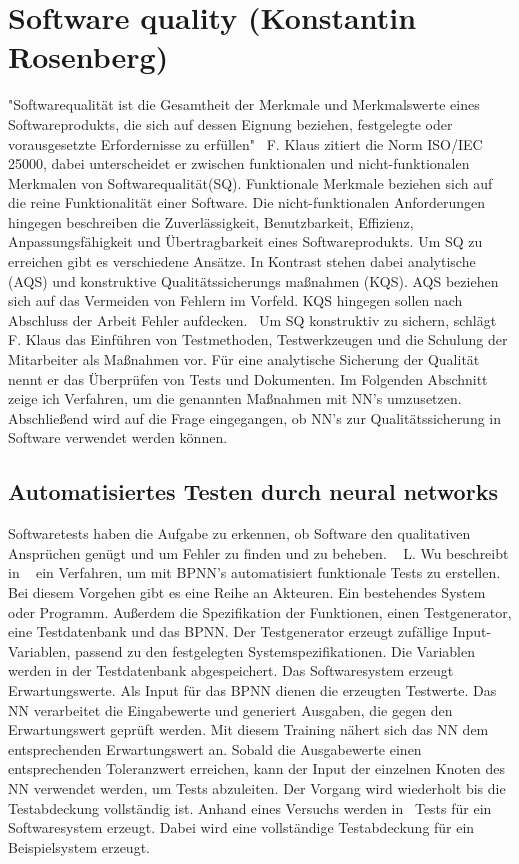 \section{Software quality (Konstantin Rosenberg)}
"Softwarequalität ist die Gesamtheit der Merkmale und Merkmalswerte eines Softwareprodukts, die sich auf dessen Eignung beziehen,
festgelegte oder vorausgesetzte
Erfordernisse zu erfüllen"~\cite[p.~20]{Franz2015}
F. Klaus zitiert die Norm ISO/IEC 25000, dabei unterscheidet er zwischen funktionalen und nicht-funktionalen Merkmalen von Softwarequalität(SQ).
Funktionale Merkmale beziehen sich auf die reine Funktionalität einer Software. Die nicht-funktionalen Anforderungen hingegen beschreiben die Zuverlässigkeit, Benutzbarkeit, Effizienz, Anpassungsfähigkeit und Übertragbarkeit eines Softwareprodukts.
Um SQ zu erreichen gibt es verschiedene Ansätze. In Kontrast stehen dabei analytische (AQS) und konstruktive Qualitätssicherungs
maßnahmen (KQS). AQS beziehen sich auf das Vermeiden von Fehlern im Vorfeld. KQS hingegen sollen nach Abschluss der Arbeit Fehler aufdecken.~\cite[p.~29]{Franz2015} 
Um SQ konstruktiv zu sichern, schlägt F. Klaus das Einführen von Testmethoden, Testwerkzeugen und die Schulung der Mitarbeiter als Maßnahmen vor. Für eine analytische Sicherung der Qualität nennt er das Überprüfen von Tests und Dokumenten.
Im Folgenden Abschnitt zeige ich Verfahren, um die genannten Maßnahmen mit NN's umzusetzen. Abschließend wird auf die Frage eingegangen, ob NN's zur Qualitätssicherung in Software verwendet werden können.

\subsection{Automatisiertes Testen durch neural networks}
Softwaretests haben die Aufgabe zu erkennen, ob Software den qualitativen Ansprüchen genügt und um Fehler zu finden und zu beheben. ~\cite{Wu2008}
L. Wu beschreibt in ~\cite{Wu2008} ein Verfahren, um mit BPNN's automatisiert funktionale Tests zu erstellen. 
Bei diesem Vorgehen gibt es eine Reihe an Akteuren. Ein bestehendes System oder Programm. Außerdem die Spezifikation der Funktionen, einen Testgenerator, eine Testdatenbank und das BPNN. Der Testgenerator erzeugt zufällige Input-Variablen, passend zu den festgelegten Systemspezifikationen. Die Variablen werden in der Testdatenbank abgespeichert. Das Softwaresystem erzeugt Erwartungswerte. Als Input für das BPNN dienen die erzeugten Testwerte. Das NN verarbeitet die Eingabewerte und generiert Ausgaben, die gegen den Erwartungswert geprüft werden.
Mit diesem Training nähert sich das NN dem entsprechenden Erwartungswert an.
Sobald die Ausgabewerte einen entsprechenden Toleranzwert erreichen, kann der Input der einzelnen Knoten des NN verwendet werden, um Tests abzuleiten. Der Vorgang wird wiederholt bis die Testabdeckung vollständig ist. Anhand eines Versuchs werden in~\cite{Wu2008} Tests für ein Softwaresystem erzeugt. Dabei wird eine vollständige Testabdeckung für ein Beispielsystem erzeugt.\\

